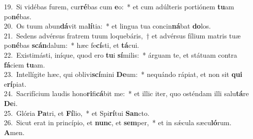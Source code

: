 {19.~}Si vidébas furem, cur\textbf{ré}bas cum \textbf{e}o:~* et cum adúlteris portiónem \textbf{tu}am po\textbf{né}bas.\\
{20.~}Os tuum abun\textbf{dá}vit ma\textbf{lí}tia:~* et lingua tua concin\textbf{ná}bat \textbf{do}los.\\
{21.~}Sedens advérsus fratrem tuum loquebáris,~† et advérsus fílium matris tuæ po\textbf{né}bas \textbf{scán}dalum:~* hæc fe\textbf{cí}sti, et \textbf{tá}cui.\\
{22.~}Existimásti, iníque, quod ero \textbf{tu}i \textbf{sí}milis:~* árguam te, et státuam contra \textbf{fá}ciem \textbf{tu}am.\\
{23.~}Intellígite hæc, qui oblivi\textbf{scí}mini \textbf{De}um:~* nequándo rápiat, et non sit \textbf{qui} e\textbf{rí}piat.\\
{24.~}Sacrifícium laudis hono\textbf{ri}fi\textbf{cá}bit me:~* et illic iter, quo osténdam illi salu\textbf{tá}re \textbf{De}i.\\
{25.~}Glória \textbf{Pa}tri, et \textbf{Fí}lio,~* et Spi\textbf{rí}tui \textbf{San}cto.\\
{26.~}Sicut erat in princípio, et \textbf{nunc}, et \textbf{sem}per,~* et in sǽcula sæcu\textbf{ló}rum. \textbf{A}men.\\
